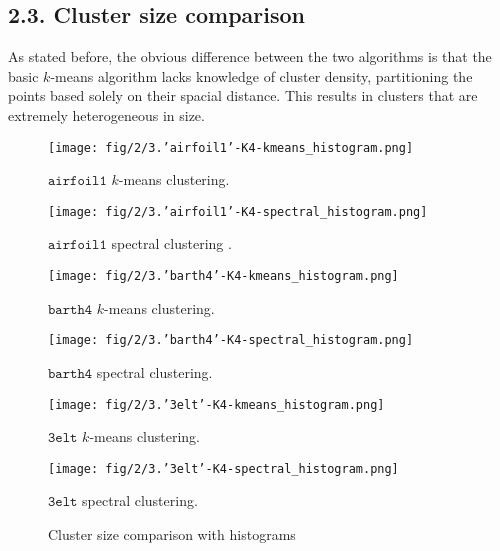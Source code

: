 \documentclass[unicode,11pt,a4paper,oneside,numbers=endperiod,openany]{scrartcl}
\begin{document}
\clearpage
\subsection*{2.3. Cluster size comparison}
As stated before, the obvious difference between the two algorithms is that the basic $k$-means algorithm lacks knowledge of cluster density, partitioning the points based solely on their spacial distance. This results in clusters that are extremely heterogeneous in size.
\begin{figure}[h!]

\begin{minipage}{\textwidth}
    \begin{minipage}{0.5\linewidth}
        \centering
        \texttt{[image: fig/2/3.'airfoil1'-K4-kmeans\_histogram.png]}
        \caption{$\texttt {airfoil1}$ $k$-means clustering.}
    \end{minipage}
    \begin{minipage}{0.5\linewidth}
        \centering
        \texttt{[image: fig/2/3.'airfoil1'-K4-spectral\_histogram.png]}
        \caption{$\texttt {airfoil1}$ spectral clustering .}
    \end{minipage}
    
    \begin{minipage}{0.5\linewidth}
        \centering
        \texttt{[image: fig/2/3.'barth4'-K4-kmeans\_histogram.png]}
        \caption{$\texttt {barth4}$ $k$-means clustering.}
    \end{minipage}
    \begin{minipage}{0.5\linewidth}
        \centering
        \texttt{[image: fig/2/3.'barth4'-K4-spectral\_histogram.png]}
        \caption{$\texttt {barth4}$ spectral clustering.}
    \end{minipage}

    \begin{minipage}{0.5\linewidth}
        \centering
        \texttt{[image: fig/2/3.'3elt'-K4-kmeans\_histogram.png]}
        \caption{$\texttt {3elt}$ $k$-means clustering.}
    \end{minipage}
    \begin{minipage}{0.5\linewidth}
        \centering
        \texttt{[image: fig/2/3.'3elt'-K4-spectral\_histogram.png]}
        \caption{$\texttt {3elt}$ spectral clustering.}
    \end{minipage}
\end{minipage}
\caption{Cluster size comparison with histograms}
\end{figure}
\end{document}
